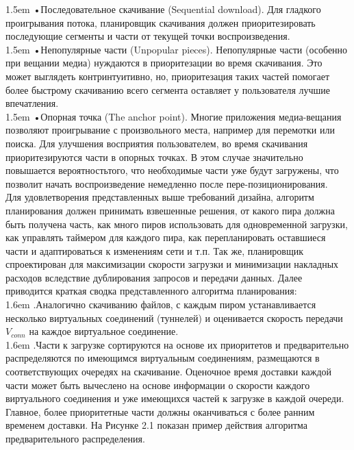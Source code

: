 \documentclass[10pt,a4paper]{article}
\begin{document}
\hangindent 1.5em
\noindent   
•\quad Последовательное скачивание (Sequential download). Для гладкого проигрывания потока, планировщик скачивания должен приоритезировать последующие сегменты и части от текущей точки воспроизведения.
\vspace{-0.8em}
\\

\hangindent 1.5em
\noindent   
•\quad Непопулярные части (Unpopular pieces). Непопулярные части (особенно при вещании медиа) нуждаются в приоритезации во время скачивания. Это может выглядеть контринтуитивно, но, приоритезация таких частей помогает более быстрому скачиванию всего сегмента оставляет у пользователя лучшие впечатления.
\vspace{-0.8em}
\\ 

\hangindent 1.5em
\noindent   
•\quad Опорная точка (The anchor point). Многие приложения медиа-вещания позволяют проигрывание с произвольного места, например для перемотки или поиска. Для улучшения восприятия пользователем, во время скачивания приоритезируются части в опорных точках. В этом случае значительно повышается вероятностьтого,  что необходимые части уже будут загружены, что позволит начать воспроизведение немедленно после пере-позиционирования.
\vspace{-0.6em}
\\ 

\noindent   
Для удовлетворения представленных выше требований дизайна, алгоритм планирования должен принимать взвешенные решения, от какого пира должна быть получена часть, как много пиров использовать для одновременной загрузки, как управлять таймером для каждого пира, как перепланировать оставшиеся части и адаптироваться к изменениям сети и т.п. Так же, планировщик спроектирован для максимизации скорости загрузки и минимизации накладных расходов вследствие дублирования запросов и передачи данных. Далее приводится краткая сводка представленного алгоритма планирования:
\vspace{-0.8em}
\\ 

\hangindent 1.6em
.\quad  Аналогично скачиванию файлов, с каждым пиром устанавливается несколько виртуальных соединений (туннелей) и оценивается скорость передачи $V_{conn}$ на каждое виртуальное соединение.
\vspace{-0.8em}
\\ 

\hangindent 1.6em
.\quad Части к загрузке сортируются на основе их приоритетов и предварительно распределяются по имеющимся виртуальным соединениям, размещаются в соответствующих очередях на скачивание. Оценочное время доставки каждой части может быть вычеслено на основе информации о скорости каждого виртуального соединения и уже имеющихся частей к загрузке в каждой очереди. Главное, более приоритетные части должны оканчиваться с более ранним временем доставки. На Рисунке 2.1 показан пример действия алгоритма предварительного распределения.
\vspace{-0.8em}
\\ 
\end{document}
